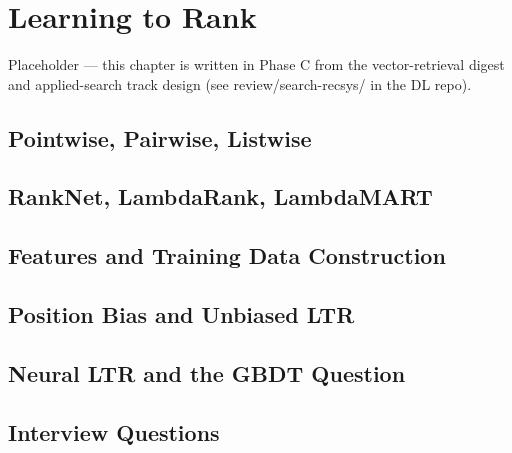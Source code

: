 \chapter{Learning to Rank}
\label{sr:chap:learning_to_rank}

\begin{tldr}
Placeholder — this chapter is written in Phase C from the vector-retrieval digest and applied-search track design (see review/search-recsys/ in the DL repo).
\end{tldr}

\section{Pointwise, Pairwise, Listwise}

\section{RankNet, LambdaRank, LambdaMART}

\section{Features and Training Data Construction}

\section{Position Bias and Unbiased LTR}

\section{Neural LTR and the GBDT Question}

\section{Interview Questions}

